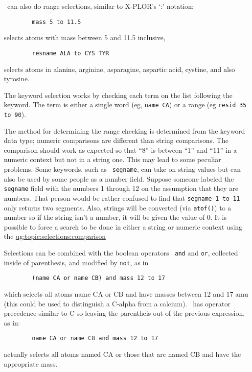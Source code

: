 \VMD\ can also do range selections, similar to X-PLOR's `:' notation:
\begin{verbatim}
        mass 5 to 11.5
\end{verbatim}
selects atoms with mass between 5 and 11.5 inclusive,
\begin{verbatim}
        resname ALA to CYS TYR
\end{verbatim}
selects atoms in alanine, arginine, asparagine, aspartic acid, cystine,
and also tyrosine.

The keyword selection works by checking each term on the list
following the keyword.  The term is either a single word (eg,
\verb!name CA!) or a range (eg \verb!resid 35 to 90!).

The method for determining the range checking is determined from the
keyword data type; numeric comparisons are different than string
comparisons.  The comparison should work as expected so that ``8'' is
between ``1'' and ``11'' in a numeric context but not in a string one.
This may lead to some peculiar problems.  Some keywords, such as {\tt
segname}, can take on string values but can also be used by some
people as a number field.  Suppose someone labeled the {\tt segname}
field with the numbers 1 through 12 on the assumption that they are
numbers.  That person would be rather confused to find that
\verb!segname 1 to 11!  only returns two segments.  Also, strings
will be converted (via {\tt atof()}) to a number so if the string
isn't a number, it will be given the value of 0.  It is possible to
force a search to be done in either a string or numeric context
using the
\hyperref{relational operator}{relational operator discussed in \S }{}
         {ug:topic:selections:comparison}

Selections can be combined with the boolean operators {\tt
and} and {\tt or}, collected inside of parenthesis, and modified by
{\tt not}, as in
\begin{verbatim}
        (name CA or name CB) and mass 12 to 17
\end{verbatim}
which selects all atoms name CA or CB and have masses between 
12 and 17 amu (this could be used to distinguish a C-alpha from a
calcium).  \VMD\ has operator precedence similar to C so leaving the parentheis out of the previous expression, as in:
\begin{verbatim}
        name CA or name CB and mass 12 to 17
\end{verbatim}
actually selects all atoms named CA or those that are named CB and
have the appropriate mass.


